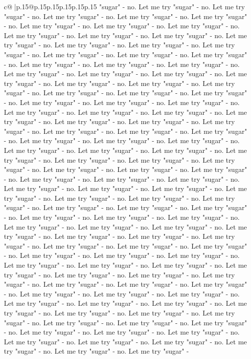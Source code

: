 \documentclass{article}
\begin{document}
{\begin{supertabular}{c@{$\;$}|p{.15\linewidth}@{}p{.15\linewidth}p{.15\linewidth}p{.15\linewidth}p{.15\linewidth}p{.15\linewidth}}
{{{"sugar" {-} no. Let me try "sugar" {-} no. Let me try "sugar" {-} no. Let me try "sugar" {-} no. Let me try "sugar" {-} no. Let me try "sugar" {-} no. Let me try "sugar" {-} no. Let me try "sugar" {-} no. Let me try "sugar" {-} no. Let me try "sugar" {-} no. Let me try "sugar" {-} no. Let me try "sugar" {-} no. Let me try "sugar" {-} no. Let me try "sugar" {-} no. Let me try "sugar" {-} no. Let me try "sugar" {-} no. Let me try "sugar" {-} no. Let me try "sugar" {-} no. Let me try "sugar" {-} no. Let me try "sugar" {-} no. Let me try "sugar" {-} no. Let me try "sugar" {-} no. Let me try "sugar" {-} no. Let me try "sugar" {-} no. Let me try "sugar" {-} no. Let me try "sugar" {-} no. Let me try "sugar" {-} no. Let me try "sugar" {-} no. Let me try "sugar" {-} no. Let me try "sugar" {-} no. Let me try "sugar" {-} no. Let me try "sugar" {-} no. Let me try "sugar" {-} no. Let me try "sugar" {-} no. Let me try "sugar" {-} no. Let me try "sugar" {-} no. Let me try "sugar" {-} no. Let me try "sugar" {-} no. Let me try "sugar" {-} no. Let me try "sugar" {-} no. Let me try "sugar" {-} no. Let me try "sugar" {-} no. Let me try "sugar" {-} no. Let me try "sugar" {-} no. Let me try "sugar" {-} no. Let me try "sugar" {-} no. Let me try "sugar" {-} no. Let me try "sugar" {-} no. Let me try "sugar" {-} no. Let me try "sugar" {-} no. Let me try "sugar" {-} no. Let me try "sugar" {-} no. Let me try "sugar" {-} no. Let me try "sugar" {-} no. Let me try "sugar" {-} no. Let me try "sugar" {-} no. Let me try "sugar" {-} no. Let me try "sugar" {-} no. Let me try "sugar" {-} no. Let me try "sugar" {-} no. Let me try "sugar" {-} no. Let me try "sugar" {-} no. Let me try "sugar" {-} no. Let me try "sugar" {-} no. Let me try "sugar" {-} no. Let me try "sugar" {-} no. Let me try "sugar" {-} no. Let me try "sugar" {-} no. Let me try "sugar" {-} no. Let me try "sugar" {-} no. Let me try "sugar" {-} no. Let me try "sugar" {-} no. Let me try "sugar" {-} no. Let me try "sugar" {-} no. Let me try "sugar" {-} no. Let me try "sugar" {-} no. Let me try "sugar" {-} no. Let me try "sugar" {-} no. Let me try "sugar" {-} no. Let me try "sugar" {-} no. Let me try "sugar" {-} no. Let me try "sugar" {-} no. Let me try "sugar" {-} no. Let me try "sugar" {-} no. Let me try "sugar" {-} no. Let me try "sugar" {-} no. Let me try "sugar" {-} no. Let me try "sugar" {-} no. Let me try "sugar" {-} no. Let me try "sugar" {-} no. Let me try "sugar" {-} no. Let me try "sugar" {-} no. Let me try "sugar" {-} no. Let me try "sugar" {-} no. Let me try "sugar" {-} no. Let me try "sugar" {-} no. Let me try "sugar" {-} no. Let me try "sugar" {-} no. Let me try "sugar" {-} no. Let me try "sugar" {-} no. Let me try "sugar" {-} no. Let me try "sugar" {-} no. Let me try "sugar" {-} no. Let me try "sugar" {-} no. Let me try "sugar" {-} no. Let me try "sugar" {-} no. Let me try "sugar" {-} no. Let me try "sugar" {-} no. Let me try "sugar" {-} no. Let me try "sugar" {-} no. Let me try "sugar" {-} no. Let me try "sugar" {-} no. Let me try "sugar" {-} no. Let me try "sugar" {-} no. Let me try "sugar" {-} no. Let me try "sugar" {-} no. Let me try "sugar" {-} no. Let me try "sugar" {-} no. Let me try "sugar" {-} }}}
\end{supertabular}}
\end{document}
